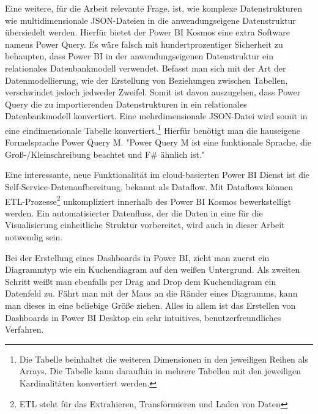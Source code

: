 Eine weitere, für die Arbeit relevante Frage, ist, wie komplexe Datenstrukturen wie multidimensionale JSON-Dateien
in die anwendungseigene Datenstruktur übersiedelt werden. Hierfür bietet der Power BI Kosmos eine extra Software
namens Power Query. Es wäre falsch mit hundertprozentiger Sicherheit zu behaupten, dass Power BI in der
anwendungseigenen Datenstruktur ein relationales Datenbankmodell verwendet. Befasst man sich mit der Art
der Datenmodellierung, wie der Erstellung von Beziehungen zwischen Tabellen, verschwindet jedoch jedweder Zweifel. \cite[S. 319]{ProPowerBIDesktop}
Somit ist davon auszugehen, dass Power Query die zu importierenden Datenstrukturen in ein relationales Datenbankmodell
konvertiert. Eine mehrdimensionale JSON-Datei wird somit in eine eindimensionale Tabelle
konvertiert.\footnote{Die Tabelle beinhaltet die weiteren Dimensionen in den jeweiligen Reihen als Arrays.
Die Tabelle kann daraufhin in mehrere Tabellen mit den jeweiligen Kardinalitäten konvertiert werden.}
Hierfür benötigt man die hauseigene Formelsprache Power Query M. "Power Query M ist eine funktionale Sprache,
die Groß-/Kleinschreibung beachtet und F\# ähnlich ist."\cite{MicrosoftDocsPowerQueryFormelsprache}

Eine interessante, neue Funktionalität im cloud-basierten Power BI Dienst ist die Self-Service-Datenaufbereitung,
bekannt als Dataflow. Mit Dataflows können ETL-Prozesse\footnote{ETL steht für das Extrahieren, Transformieren und Laden von Daten}
unkompliziert innerhalb des Power BI Kosmos bewerkstelligt werden. Ein automatisierter Datenfluss,
der die Daten in eine für die Visualisierung einheitliche Struktur vorbereitet, wird auch in dieser
Arbeit notwendig sein.

Bei der Erstellung eines Dashboards in Power BI, zieht man zuerst ein Diagrammtyp wie ein Kuchendiagram
auf den weißen Untergrund. Als zweiten Schritt weißt man ebenfalls per Drag and Drop dem Kuchendiagram ein
Datenfeld zu. Fährt man mit der Maus an die Ränder eines Diagramms, kann man dieses in eine beliebige Größe
ziehen. Alles in allem ist das Erstellen von Dashboards in Power BI Desktop ein sehr intuitives,
benutzerfreundliches Verfahren.

